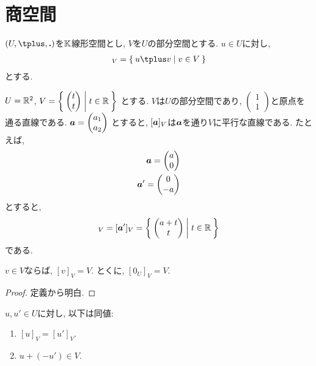 \section{商空間}
$(U,\plus,\act)$を$\mathbb{K}$線形空間とし,
$V$を$U$の部分空間とする.
$u\in U$に対し,
\begin{align*}
  [u]_V=\Set{u\plus v|v\in V}
\end{align*}
とする.
\begin{example}
$U=\mathbb{R}^2$, $V=\Set{\begin{pmatrix}t\\t\end{pmatrix}|t\in\mathbb{R}}$
  とする. $V$は$U$の部分空間であり,
  $\begin{pmatrix}1\\1\end{pmatrix}$と原点を通る直線である.
  $\boldsymbol{a}=\begin{pmatrix}a_1\\a_2\end{pmatrix}$
  とすると,
  $[\boldsymbol{a}]_V$は$\boldsymbol{a}$を通り$V$に平行な直線である.
  たとえば,
  \begin{align*}
    \boldsymbol{a}=\begin{pmatrix}a\\0\end{pmatrix}\\
    \boldsymbol{a}'=\begin{pmatrix}0\\-a\end{pmatrix}
  \end{align*}
  とすると,
  \begin{align*}
    [\aaa]_V=[\aaa']_V=\Set{\begin{pmatrix}a+t\\t\end{pmatrix}|t\in\RR}
  \end{align*}
  である.
  \begin{figure}\caption{}\end{figure}
\end{example}
\begin{lemma}
$v\in V$ならば, $[v]_V=V$.
とくに,  $[0_U]_V=V$.
\end{lemma}
\begin{proof}
定義から明白.
\end{proof}
\begin{lemma}
$u,u'\in U$に対し, 以下は同値:
\begin{enumerate}
\item
\label{item:quotientclass:1}
$[u]_V=[u']_V$.
\item
\label{item:quotientclass:2}
$u\plus (-u') \in V$.
\end{enumerate}
\end{lemma}
